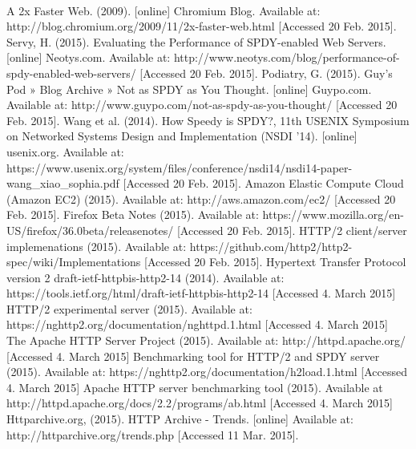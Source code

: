 \documentclass{article}
\begin{document}
\newpage










\begin{thebibliography}
\\
A 2x Faster Web. (2009). [online] Chromium Blog. Available at: http://blog.chromium.org/2009/11/2x-faster-web.html [Accessed 20 Feb. 2015].
Servy, H. (2015). Evaluating the Performance of SPDY-enabled Web Servers. [online] Neotys.com. Available at: http://www.neotys.com/blog/performance-of-spdy-enabled-web-servers/ [Accessed 20 Feb. 2015].
Podiatry, G. (2015). Guy's Pod » Blog Archive » Not as SPDY as You Thought. [online] Guypo.com. Available at: http://www.guypo.com/not-as-spdy-as-you-thought/ [Accessed 20 Feb. 2015].
Wang et al. (2014). How Speedy is SPDY?, 11th USENIX Symposium on Networked Systems Design and Implementation (NSDI ’14). [online] usenix.org. Available at:
https://www.usenix.org/system/files/conference/nsdi14/nsdi14-paper-wang\_xiao\_sophia.pdf [Accessed 20 Feb. 2015].
 Amazon Elastic Compute Cloud (Amazon EC2) (2015). Available at: http://aws.amazon.com/ec2/ [Accessed 20 Feb. 2015].
 Firefox Beta Notes (2015). Available at: https://www.mozilla.org/en-US/firefox/36.0beta/releasenotes/ [Accessed 20 Feb. 2015].
  HTTP/2 client/server implemenations (2015). Available at: https://github.com/http2/http2-spec/wiki/Implementations [Accessed 20 Feb. 2015].
 Hypertext Transfer Protocol version 2 draft-ietf-httpbis-http2-14 (2014). Available at: https://tools.ietf.org/html/draft-ietf-httpbis-http2-14 [Accessed 4. March 2015]
 HTTP/2 experimental server (2015). Available at: https://nghttp2.org/documentation/nghttpd.1.html [Accessed 4. March 2015]
 The Apache HTTP Server Project (2015). Available at: http://httpd.apache.org/ [Accessed 4. March 2015]
 Benchmarking tool for HTTP/2 and SPDY server (2015). Available at: https://nghttp2.org/documentation/h2load.1.html [Accessed 4. March 2015]
 Apache HTTP server benchmarking tool (2015). Available at http://httpd.apache.org/docs/2.2/programs/ab.html [Accessed 4. March 2015]
 Httparchive.org, (2015). HTTP Archive - Trends. [online] Available at: http://httparchive.org/trends.php [Accessed 11 Mar. 2015].
\end{thebibliography}

\newpage
\appendix
\end{document}
